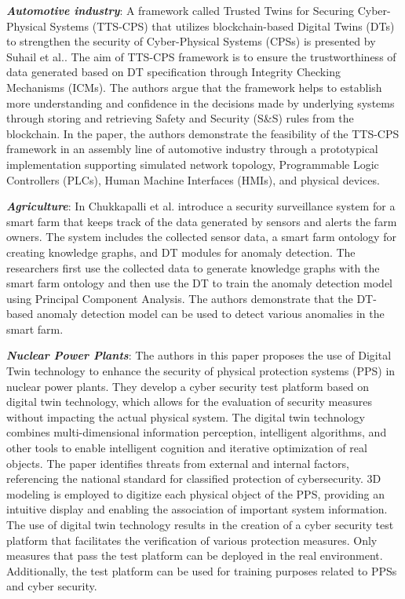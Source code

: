 \textbf{\textit{Automotive industry}}: A framework called Trusted Twins for Securing Cyber-Physical Systems (TTS-CPS) that utilizes blockchain-based Digital Twins (DTs) to strengthen the security of Cyber-Physical Systems (CPSs) is presented by Suhail et al.\cite{suhailSituationalAwareCyberphysical2022}. The aim of TTS-CPS framework is to ensure the trustworthiness of data generated based on DT specification through Integrity Checking Mechanisms (ICMs). The authors argue that the framework helps to establish more understanding and confidence in the decisions made by underlying systems through storing and retrieving Safety and Security (S\&S) rules from the blockchain. In the paper, the authors demonstrate the feasibility of the TTS-CPS framework in an assembly line of automotive industry through a prototypical implementation supporting simulated network topology, Programmable Logic Controllers (PLCs), Human Machine Interfaces (HMIs), and physical devices. 

\textbf{\textit{Agriculture}}: In\cite{chukkapalliCyberPhysicalSystemSecurity2021} Chukkapalli et al. introduce a security surveillance system for a smart farm that keeps track of the data generated by sensors and alerts the farm owners. The system includes the collected sensor data, a smart farm ontology for creating knowledge graphs, and DT modules for anomaly detection. The researchers first use the collected data to generate knowledge graphs with the smart farm ontology and then use the DT to train the anomaly detection model using Principal Component Analysis. The authors demonstrate that the DT-based anomaly detection model can be used to detect various anomalies in the smart farm.

\textbf{\textit{Nuclear Power Plants}}: The authors in this \cite{guoCyberSecurityRisk2021a} paper proposes the use of Digital Twin technology to enhance the security of physical protection systems (PPS) in nuclear power plants. They develop a cyber security test platform based on digital twin technology, which allows for the evaluation of security measures without impacting the actual physical system. The digital twin technology combines multi-dimensional information perception, intelligent algorithms, and other tools to enable intelligent cognition and iterative optimization of real objects. The paper identifies threats from external and internal factors, referencing the national standard for classified protection of cybersecurity. 3D modeling is employed to digitize each physical object of the PPS, providing an intuitive display and enabling the association of important system information. The use of digital twin technology results in the creation of a cyber security test platform that facilitates the verification of various protection measures. Only measures that pass the test platform can be deployed in the real environment. Additionally, the test platform can be used for training purposes related to PPSs and cyber security.